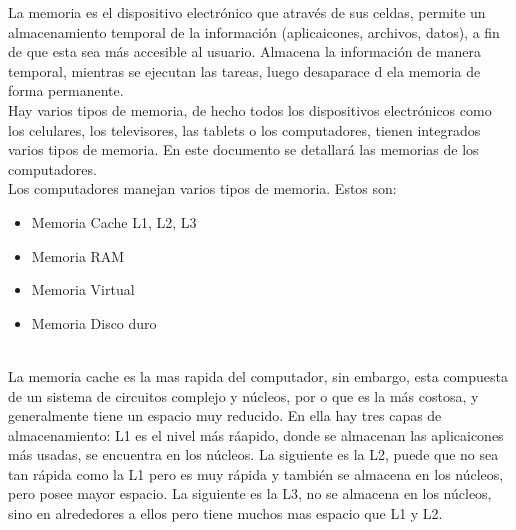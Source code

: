 \documentclass{article}
\begin{document}
La memoria es el dispositivo electrónico que através de sus celdas, permite un almacenamiento temporal de la información (aplicaicones, archivos, datos), a fin de que esta sea más accesible al usuario. Almacena la información de manera temporal, mientras se ejecutan  las tareas, luego desaparace d ela memoria de forma permanente. \vspace{5mm} %
\\
Hay varios tipos de memoria, de hecho todos los dispositivos electrónicos como los celulares, los televisores, las tablets o los computadores, tienen integrados varios tipos de memoria. En este documento se detallará las memorias de los computadores.  \vspace{5mm} %
\\
Los computadores manejan varios tipos de memoria. Estos son:
\\
\begin{itemize}
  \item Memoria Cache L1, L2, L3
  \item Memoria RAM
  \item Memoria Virtual 
  \item Memoria Disco duro
\end{itemize}
\\
La memoria cache es la mas rapida del computador, sin embargo, esta compuesta de un sistema de circuitos complejo y núcleos, por o que es la más costosa, y generalmente tiene un espacio muy reducido. En ella hay tres capas de almacenamiento: L1 es el nivel más ráapido, donde se almacenan las aplicaicones más usadas, se encuentra en los núcleos. La siguiente es la L2, puede que no sea tan rápida como la L1 pero es muy rápida y también se almacena en los núcleos, pero posee mayor espacio. La siguiente es la L3, no se almacena en los núcleos, sino en alrededores a ellos pero tiene muchos mas espacio que L1 y L2. \vspace{5mm} %
\end{document}
